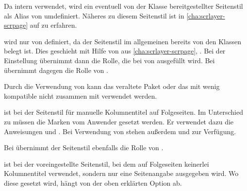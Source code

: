 \begin{description}
  Da  intern
  \hyperref[cha:scrlayer-scrpage]{} verwendet, wird
  ein eventuell von der Klasse bereitgestellter Seitenstil
   als Alias von
   umdefiniert. Näheres zu
  diesem Seitenstil ist in \autoref{cha:scrlayer-scrpage} auf
   zu erfahren.
\item[{\PageStyle{letter}}] %
  wird nur von  definiert, da der
  Seitenstil  im allgemeinen bereits von den Klassen
  belegt ist. Dies geschieht mit Hilfe von
  \hyperref[cha:scrlayer-scrpage]{} aus
  \autoref{cha:scrlayer-scrpage}, . Bei der
  Einstellung %
   übernimmt  dann die Rolle, die bei
   von  ausgefüllt
  wird. Bei %
   übernimmt  dagegen die Rolle von
  .
  
  Durch die Verwendung von
  \hyperref[cha:scrlayer-scrpage]{} kann das
  veraltete Paket  oder das mit
  \KOMAScript{} wenig kompatible \iffalse Paket \fi%
   nicht zusammen mit
   verwendet werden.
\item[{\PageStyle{myheadings}}] %
  ist bei  der Seitenstil für
  manuelle Kolumnentitel auf Folgeseiten. Im Unterschied zu 
  müssen die Marken vom Anwender gesetzt werden. Er verwendet dazu die
  Anweisungen  und
  . Bei Verwendung von
  \hyperref[cha:scrlayer-scrpage]{} stehen außerdem
   und
   zur
  Verfügung.

  Bei  übernimmt der
  Seitenstil  ebenfalls die Rolle von
  .
\item[{\PageStyle{plain}}]
  ist bei 
  der voreingestellte Seitenstil, bei dem auf Folgeseiten keinerlei
  Kolumnentitel verwendet, sondern nur eine Seitenangabe ausgegeben wird. Wo
  diese gesetzt wird, hängt von der oben erklärten Option
   ab.


\end{description}
